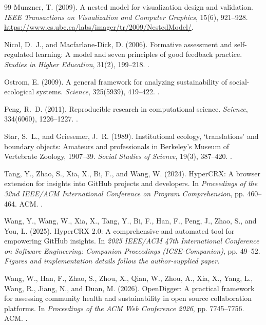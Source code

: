 \begin{thebibliography}{99}
Munzner, T. (2009).
A nested model for visualization design and validation.
\emph{IEEE Transactions on Visualization and Computer Graphics}, 15(6), 921--928.
\url{https://www.cs.ubc.ca/labs/imager/tr/2009/NestedModel/}.

Nicol, D.~J., and Macfarlane-Dick, D. (2006).
Formative assessment and self-regulated learning: A model and seven principles of good feedback practice.
\emph{Studies in Higher Education}, 31(2), 199--218.
.

Ostrom, E. (2009).
A general framework for analyzing sustainability of social-ecological systems.
\emph{Science}, 325(5939), 419--422.
.

Peng, R.~D. (2011).
Reproducible research in computational science.
\emph{Science}, 334(6060), 1226--1227.
.

Star, S.~L., and Griesemer, J.~R. (1989).
Institutional ecology, `translations' and boundary objects: Amateurs and professionals in Berkeley's Museum of Vertebrate Zoology, 1907--39.
\emph{Social Studies of Science}, 19(3), 387--420.
.

Tang, Y., Zhao, S., Xia, X., Bi, F., and Wang, W. (2024).
HyperCRX: A browser extension for insights into GitHub projects and developers.
In \emph{Proceedings of the 32nd IEEE/ACM International Conference on Program Comprehension}, pp. 460--464. ACM.
.

Wang, Y., Wang, W., Xia, X., Tang, Y., Bi, F., Han, F., Peng, J., Zhao, S., and You, L. (2025).
HyperCRX 2.0: A comprehensive and automated tool for empowering GitHub insights.
In \emph{2025 IEEE/ACM 47th International Conference on Software Engineering: Companion Proceedings (ICSE-Companion)}, pp. 49--52.
\emph{Figures and implementation details follow the author-supplied paper.}

Wang, W., Han, F., Zhao, S., Zhou, X., Qian, W., Zhou, A., Xia, X., Yang, L., Wang, R., Jiang, N., and Duan, M. (2026).
OpenDigger: A practical framework for assessing community health and sustainability in open source collaboration platforms.
In \emph{Proceedings of the ACM Web Conference 2026}, pp. 7745--7756. ACM.
.


\end{thebibliography}
